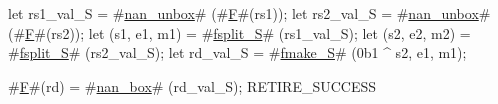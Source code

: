 let rs1_val_S    = #\hyperref[sailRISCVznanzyunbox]{nan\_unbox}# (#\hyperref[sailRISCVzF]{F}#(rs1));
let rs2_val_S    = #\hyperref[sailRISCVznanzyunbox]{nan\_unbox}# (#\hyperref[sailRISCVzF]{F}#(rs2));
let (s1, e1, m1) = #\hyperref[sailRISCVzfsplitzyS]{fsplit\_S}# (rs1_val_S);
let (s2, e2, m2) = #\hyperref[sailRISCVzfsplitzyS]{fsplit\_S}# (rs2_val_S);
let rd_val_S     = #\hyperref[sailRISCVzfmakezyS]{fmake\_S}# (0b1 ^ s2, e1, m1);

#\hyperref[sailRISCVzF]{F}#(rd) = #\hyperref[sailRISCVznanzybox]{nan\_box}# (rd_val_S);
RETIRE_SUCCESS
